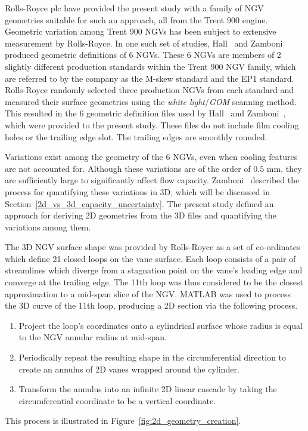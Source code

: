 \documentclass[a4paper, 11pt, oneside]{report}
\begin{document}
Rolls-Royce plc have provided the present study with a family of NGV geometries suitable for such an approach, all from the Trent 900 engine. Geometric variation among Trent 900 NGVs has been subject to extensive measurement by Rolls-Royce. In one such set of studies, Hall~\cite{hall_area} and Zamboni~\cite{zamboni_area} produced geometric definitions of 6 NGVs. These 6 NGVs are members of 2 slightly different production standards within the Trent 900 NGV family, which are referred to by the company as the M-skew standard and the EP1 standard. Rolls-Royce randomly selected three production NGVs from each standard and measured their surface geometries using the \textit{white light}/\textit{GOM} scanning method. This resulted in the 6 geometric definition files used by Hall~\cite{hall_area} and Zamboni~\cite{zamboni_area}, which were provided to the present study. These files do not include film cooling holes or the trailing edge slot. The trailing edges are smoothly rounded.

Variations exist among the geometry of the 6 NGVs, even when cooling features are not accounted for. Although these variations are of the order of $0.5$ mm, they are sufficiently large to significantly affect flow capacity. Zamboni~\cite{zamboni_area} described the process for quantifying these variations in 3D, which will be discussed in Section~\ref{2d_vs_3d_capacity_uncertainty}. The present study defined an approach for deriving 2D geometries from the 3D files and quantifying the variations among them.

The 3D NGV surface shape was provided by Rolls-Royce as a set of co-ordinates which define 21 closed loops on the vane surface. Each loop consists of a pair of streamlines which diverge from a stagnation point on the vane's leading edge and converge at the trailing edge. The 11th loop was thus considered to be the closest approximation to a mid-span slice of the NGV. MATLAB was used to process the 3D curve of the 11th loop, producing a 2D section via the following process. 
\begin{enumerate}
  \item Project the loop's coordinates onto a cylindrical surface whose radius is equal to the NGV annular radius at mid-span.
  \item Periodically repeat the resulting shape in the circumferential direction to create an annulus of 2D vanes wrapped around the cylinder.
  \item Transform the annulus into an infinite 2D linear cascade by taking the circumferential coordinate to be a vertical coordinate.
\end{enumerate}
This process is illustrated in Figure~\ref{fig:2d_geometry_creation}.
\end{document}
